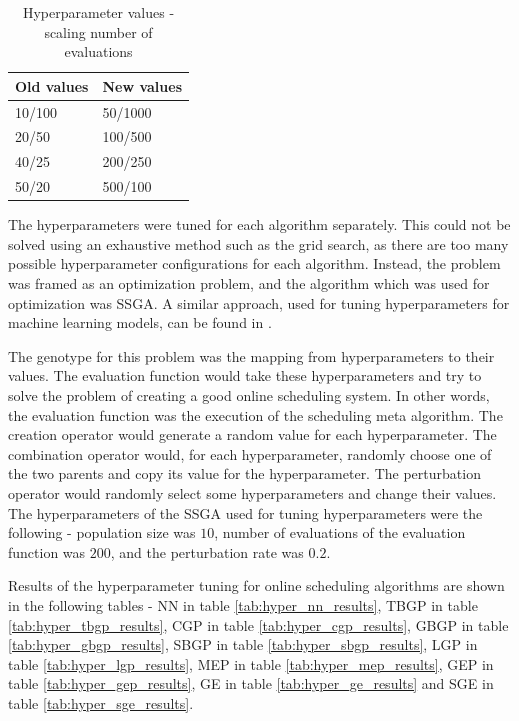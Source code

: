 \begin{table}[!htbp]
    \begin{center}
        \begin{tabular}{|l|l|} 
         \hline
            Old values & New values \\ [0.5ex] \hline\hline
            10/100 & 50/1000 \\
            \hline
            20/50 & 100/500 \\
            \hline
            40/25 & 200/250 \\
            \hline
            50/20 & 500/100 \\
            \hline
        \end{tabular}
    \end{center}
    \caption{Hyperparameter values - scaling number of evaluations}
\label{tab:hyper_scale_evaluations}
\end{table}

The hyperparameters were tuned for each algorithm separately. This could not be solved using an exhaustive method such as the grid search, as there are too many possible hyperparameter configurations for each algorithm. Instead, the problem was framed as an optimization problem, and the algorithm which was used for optimization was SSGA. A similar approach, used for tuning hyperparameters for machine learning models, can be found in \citep{hyperopti}.

The genotype for this problem was the mapping from hyperparameters to their values. The evaluation function would take these hyperparameters and try to solve the problem of creating a good online scheduling system. In other words, the evaluation function was the execution of the scheduling meta algorithm. The creation operator would generate a random value for each hyperparameter. The combination operator would, for each hyperparameter, randomly choose one of the two parents and copy its value for the hyperparameter. The perturbation operator would randomly select some hyperparameters and change their values. The hyperparameters of the SSGA used for tuning hyperparameters were the following - population size was $10$, number of evaluations of the evaluation function was $200$, and the perturbation rate was $0.2$.

Results of the hyperparameter tuning for online scheduling algorithms are shown in the following tables - NN in table \ref{tab:hyper_nn_results}, 
TBGP in table \ref{tab:hyper_tbgp_results}, CGP in table \ref{tab:hyper_cgp_results}, GBGP in table \ref{tab:hyper_gbgp_results}, SBGP in table \ref{tab:hyper_sbgp_results}, LGP in table \ref{tab:hyper_lgp_results}, MEP in table \ref{tab:hyper_mep_results}, GEP in table \ref{tab:hyper_gep_results}, GE in table \ref{tab:hyper_ge_results} and SGE in table \ref{tab:hyper_sge_results}.

